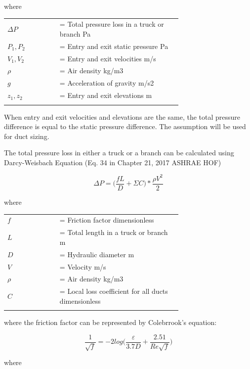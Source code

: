 where

\begin{tabular}{lp{0.7\linewidth}}
\\
$\Delta P$ &= Total pressure loss in a truck or branch {Pa}\\
$P_1, P_2$ &= Entry and exit static pressure {Pa}\\
$V_1, V_2$ &= Entry and exit velocities {m/s}\\
$\rho$ &= Air density {kg/m3}\\
$g$ &= Acceleration of gravity {m/s2}\\
$z_1, z_2$ &= Entry and exit elevations {m}\\
\\
\end{tabular}

When entry and exit velocities and elevations are the same, the total pressure difference is equal to the static pressure difference. The assumption will be used for duct sizing. 

The total pressure loss in either a truck or a branch can be calculated using Darcy-Weisbach Equation (Eq. 34 in Chapter 21, 2017 ASHRAE HOF)

\begin{equation}
\Delta P =  \big( \frac{ f L}{D} +  \Sigma C ) *  \frac{ \rho  V^{2} }{2}  
\end{equation}

where

\begin{tabular}{lp{0.7\linewidth}}
\\
$f$ &= Friction factor {dimensionless}\\
$L$ &= Total length in a truck or branch {m}\\
$D$ &= Hydraulic diameter {m}\\
$V$ &= Velocity {m/s}\\
$\rho$ &= Air density {kg/m3}\\
$C$ &= Local loss coefficient for all ducts {dimensionless}\\
\\
\end{tabular}

where the friction factor can be represented by Colebrrook's equation:

\begin{equation}
\frac{1}{\sqrt{f}} = -2 log\big( \frac{ \varepsilon }{3.7 D} +  \frac{2.51}{Re\sqrt{f}}) 
\end{equation}

where

